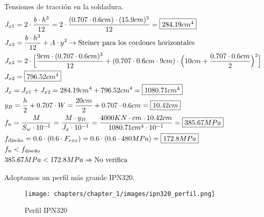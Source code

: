 \begin{enumerate}
\begin{itemize}
Tensiones de tracción en la soldadura.\\
\begin{align*}
& J_{x1} = 2 \cdot \frac{b \cdot h^3}{12} = 2 \cdot \frac{(0.707 \cdot 0.6cm) \cdot (15.9cm)^3}{12} = \framebox{$284.19cm^4$} \\
& J_{x2} = \frac{b \cdot h^3}{12} + A \cdot y^2 \rightarrow \text{Steiner para los cordones horizontales} \\
& J_{x2} = 2 \cdot \Big[\frac{9cm \cdot (0.707 \cdot 0.6cm)^3}{12} + (0.707 \cdot 0.6cm \cdot 9cm) \cdot \Big(10cm+ \frac{0.707 \cdot 0.6cm}{2}\Big)^2\Big] \\
& J_{x2} = \framebox{$796.52cm^4$} \\
& J_x = J_{x1} + J_{x2} = 284.19cm^4 + 796.52cm^4 = \framebox{$1080.71cm^4$} \\
& y_B = \frac{h}{2} + 0.707 \cdot W = \frac{20cm}{2} + 0.707 \cdot 0.6cm = \framebox{$10.42cm$} \\
& f_n = \frac{M}{S_w \cdot 10^{-1}} = \frac{M \cdot y_B}{J_x \cdot 10^{-1}} = \frac{4000 KN \cdot cm \cdot 10.42cm}{1080.71cm^4 \cdot 10^{-1}} = \framebox{$385.67MPa$} \\
& f_{\text{diseño}} = 0.6 \cdot (0.6 \cdot F_{exx}) = 0.6 \cdot (0.6 \cdot 480MPa) = \framebox{$172.8MPa$} \\
& f_n < f_{\text{diseño}} \\
& 385.67MPa < 172.8MPa \Rightarrow \text{No verifica}
\end{align*}

Adoptamos un perfil más grande IPN320.\\

\begin{figure}[H]
\begin{center}
     \texttt{[image: chapters/chapter\_1/images/ipn320\_perfil.png]}
\end{center}
\caption{Perfil IPN320}
\end{figure}


\end{itemize}
\end{enumerate}
